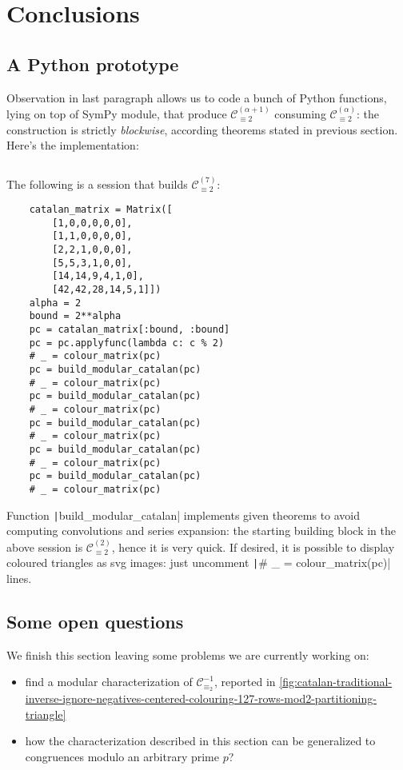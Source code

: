 
\section{Conclusions}
\label{sec:conclusions}

\subsection{A Python prototype}

Observation in last paragraph allows us to code a bunch of Python functions, 
lying on top of SymPy module, that produce 
$\mathcal{C}_{\equiv 2}^{(\alpha+1)}$ consuming $\mathcal{C}_{\equiv 2}^{(\alpha)}$:
the construction is strictly \emph{blockwise}, according theorems stated
in previous section. Here's the implementation:

\begin{adjustwidth}{-4cm}{0cm}
    \inputminted{python}{../../PhD/projects/recurrences-unfolding/sympy-notebook/colouring.py}
\end{adjustwidth}

The following is a session that builds $\mathcal{C}_{\equiv 2}^{(7)}$:
\begin{verbatim}
    catalan_matrix = Matrix([
        [1,0,0,0,0,0], 
        [1,1,0,0,0,0], 
        [2,2,1,0,0,0], 
        [5,5,3,1,0,0], 
        [14,14,9,4,1,0], 
        [42,42,28,14,5,1]])
    alpha = 2
    bound = 2**alpha
    pc = catalan_matrix[:bound, :bound]
    pc = pc.applyfunc(lambda c: c % 2)
    # _ = colour_matrix(pc)
    pc = build_modular_catalan(pc)
    # _ = colour_matrix(pc)
    pc = build_modular_catalan(pc)
    # _ = colour_matrix(pc)
    pc = build_modular_catalan(pc)
    # _ = colour_matrix(pc)
    pc = build_modular_catalan(pc)
    # _ = colour_matrix(pc)
    pc = build_modular_catalan(pc)
    # _ = colour_matrix(pc)
\end{verbatim}

Function \texttt|build_modular_catalan| implements given theorems to avoid
computing convolutions and series expansion: the starting building block in the 
above session is $\mathcal{C}_{\equiv 2}^{(2)}$, hence it is very quick. 
If desired, it is possible to display coloured triangles as svg images:
just uncomment \texttt|# _ = colour_matrix(pc)| lines.

\subsection{Some open questions}


We finish this section leaving some problems we are currently working on:
\begin{itemize}
    \item find a modular characterization of $\mathcal{C}_{\equiv_{2}}^{-1}$, reported in 
        \autoref{fig:catalan-traditional-inverse-ignore-negatives-centered-colouring-127-rows-mod2-partitioning-triangle}
    \item how the characterization described in this section can be generalized to congruences modulo an arbitrary prime $p$?
\end{itemize}
